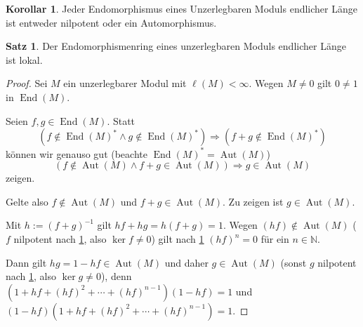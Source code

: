 \documentclass[
twoside=semi,
fontsize=12,
DIV=12, 
cleardoublepage=current,
leqno,
headings=optiontoheadandtoc, 
toc=idx
]{scrbook}
\newcommand{\N}{\mathbb{N}}
\DeclareMathOperator{\End}{End}
\DeclareMathOperator{\Aut}{Aut}
\theoremstyle{definition}
\newtheorem{satz}[definition]{Satz}
\newtheorem{korollar}[definition]{Korollar}
\begin{document}
	\begin{korollar}\label{1.5.11}\hfill\newline
		Jeder Endomorphismus eines Unzerlegbaren Moduls endlicher L\"ange ist entweder nilpotent oder ein Automorphismus.
	\end{korollar}

	\begin{satz}\label{1.5.12}\hfill\newline
		Der Endomorphismenring eines unzerlegbaren Moduls endlicher L\"ange ist lokal.
		
		\begin{proof}
			Sei $M$ ein unzerlegbarer Modul mit $\ell(M) < \infty$. Wegen $M \neq 0$ gilt $0 \neq 1$ in $\End(M)$.
			
			Seien $f, g \in \End(M)$. Statt 
				\[(f\notin \End(M)^* \land g\notin \End(M)^*) \Longrightarrow (f+g \notin \End(M)^*)\]
			k\"onnen wir genauso gut (beachte $\End(M)^* = \Aut(M)$)
				\[(f\notin \Aut(M) \land f+g \in \Aut(M)) \Longrightarrow g \in \Aut(M)\]
			zeigen.
			
			Gelte also $f \notin \Aut(M)$ und $f+g \in \Aut(M)$. Zu zeigen ist $g \in \Aut(M)$.
			
			\noindent Mit $h:= (f+g)^{-1}$ gilt $hf + hg = h(f+g) = 1$. Wegen $(hf) \notin \Aut(M)$ ($f$ nilpotent nach \ref{1.5.11}, also $\ker f \neq 0$) gilt nach \ref{1.5.11} $(hf)^n = 0$ f\"ur ein $n \in \N$. 
			
			\noindent Dann gilt $hg = 1 - hf \in \Aut(M)$ und daher $g \in \Aut(M)$ (sonst $g$ nilpotent nach \ref{1.5.11}, also $\ker g \neq 0$),
			denn $(1+hf+(hf)^2 + \cdots + (hf)^{n-1})(1-hf) = 1$ und \linebreak $(1-hf)(1+hf+(hf)^2 + \cdots + (hf)^{n-1}) = 1$.
		\end{proof}
	\end{satz}
\end{document}
